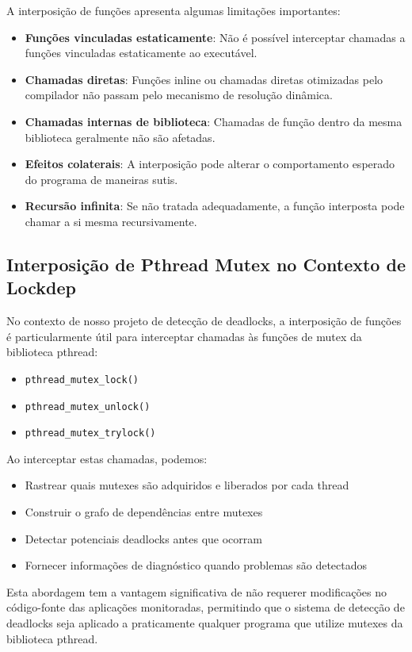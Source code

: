 A interposição de funções apresenta algumas limitações importantes:

\begin{itemize}
    \item \textbf{Funções vinculadas estaticamente}: Não é possível interceptar chamadas a funções vinculadas estaticamente ao executável.
    \item \textbf{Chamadas diretas}: Funções inline ou chamadas diretas otimizadas pelo compilador não passam pelo mecanismo de resolução dinâmica.
    \item \textbf{Chamadas internas de biblioteca}: Chamadas de função dentro da mesma biblioteca geralmente não são afetadas.
    \item \textbf{Efeitos colaterais}: A interposição pode alterar o comportamento esperado do programa de maneiras sutis.
    \item \textbf{Recursão infinita}: Se não tratada adequadamente, a função interposta pode chamar a si mesma recursivamente.
\end{itemize}

\subsection{Interposição de Pthread Mutex no Contexto de Lockdep}

No contexto de nosso projeto de detecção de deadlocks, a interposição de funções é particularmente útil para interceptar chamadas às funções de mutex da biblioteca pthread:

\begin{itemize}
    \item \texttt{pthread_mutex_lock()}
    \item \texttt{pthread_mutex_unlock()}
    \item \texttt{pthread_mutex_trylock()}
\end{itemize}

Ao interceptar estas chamadas, podemos:
\begin{itemize}
    \item Rastrear quais mutexes são adquiridos e liberados por cada thread
    \item Construir o grafo de dependências entre mutexes
    \item Detectar potenciais deadlocks antes que ocorram
    \item Fornecer informações de diagnóstico quando problemas são detectados
\end{itemize}

Esta abordagem tem a vantagem significativa de não requerer modificações no código-fonte das aplicações monitoradas, permitindo que o sistema de detecção de deadlocks seja aplicado a praticamente qualquer programa que utilize mutexes da biblioteca pthread.
